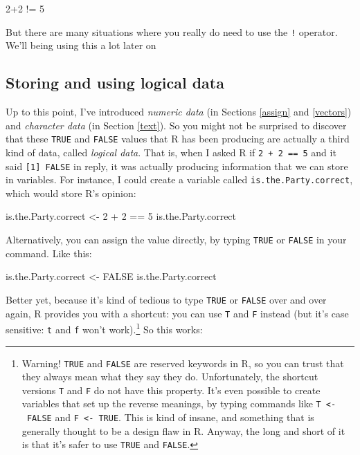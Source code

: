 \documentclass[
]{book}
\newenvironment{Shaded}{\begin{snugshade}}{\end{snugshade}}
\newcommand{\ConstantTok}[1]{\textcolor[rgb]{0.00,0.00,0.00}{#1}}
\newcommand{\DecValTok}[1]{\textcolor[rgb]{0.00,0.00,0.81}{#1}}
\newcommand{\NormalTok}[1]{#1}
\newcommand{\OtherTok}[1]{\textcolor[rgb]{0.56,0.35,0.01}{#1}}
\newcommand{\SpecialCharTok}[1]{\textcolor[rgb]{0.00,0.00,0.00}{#1}}
\begin{document}
\begin{Shaded}
\begin{Highlighting}[]
\DecValTok{2}\SpecialCharTok{+}\DecValTok{2} \SpecialCharTok{!=} \DecValTok{5}
\end{Highlighting}
\end{Shaded}

But there are many situations where you really do need to use the \texttt{!} operator. We'll being using this a lot later on

\hypertarget{storing-and-using-logical-data}{%
\subsection{Storing and using logical data}\label{storing-and-using-logical-data}}

Up to this point, I've introduced \emph{numeric data} (in Sections \ref{assign} and \ref{vectors}) and \emph{character data} (in Section \ref{text}). So you might not be surprised to discover that these \texttt{TRUE} and \texttt{FALSE} values that R has been producing are actually a third kind of data, called \emph{logical data}. That is, when I asked R if \texttt{2\ +\ 2\ ==\ 5} and it said \texttt{{[}1{]}\ FALSE} in reply, it was actually producing information that we can store in variables. For instance, I could create a variable called \texttt{is.the.Party.correct}, which would store R's opinion:

\begin{Shaded}
\begin{Highlighting}[]
\NormalTok{is.the.Party.correct }\OtherTok{\textless{}{-}} \DecValTok{2} \SpecialCharTok{+} \DecValTok{2} \SpecialCharTok{==} \DecValTok{5}
\NormalTok{is.the.Party.correct}
\end{Highlighting}
\end{Shaded}

Alternatively, you can assign the value directly, by typing \texttt{TRUE} or \texttt{FALSE} in your command. Like this:

\begin{Shaded}
\begin{Highlighting}[]
\NormalTok{is.the.Party.correct }\OtherTok{\textless{}{-}} \ConstantTok{FALSE}
\NormalTok{is.the.Party.correct}
\end{Highlighting}
\end{Shaded}

Better yet, because it's kind of tedious to type \texttt{TRUE} or \texttt{FALSE} over and over again, R provides you with a shortcut: you can use \texttt{T} and \texttt{F} instead (but it's case sensitive: \texttt{t} and \texttt{f} won't work).\footnote{Warning! \texttt{TRUE} and \texttt{FALSE} are reserved keywords in R, so you can trust that they always mean what they say they do. Unfortunately, the shortcut versions \texttt{T} and \texttt{F} do not have this property. It's even possible to create variables that set up the reverse meanings, by typing commands like \texttt{T\ \textless{}-\ FALSE} and \texttt{F\ \textless{}-\ TRUE}. This is kind of insane, and something that is generally thought to be a design flaw in R. Anyway, the long and short of it is that it's safer to use \texttt{TRUE} and \texttt{FALSE}.} So this works:
\end{document}
